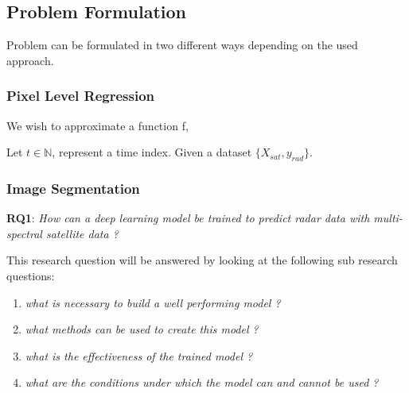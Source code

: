 \documentclass[acmtog, authorversion]{acmart}
\begin{document}


\subsection{Problem Formulation}
Problem can be formulated in two different ways depending on the used approach.

\subsubsection{Pixel Level Regression}
We wish to approximate a function f,

Let $t \in \mathbb{N}$, represent a time index.
Given a dataset $\{X_{sat}, y_{rad}\}$.  

\subsubsection{Image Segmentation}


\textbf{RQ1}: \textit{How can a deep learning model be trained to predict radar data with multi-spectral satellite data ?}
\smallskip

This research question will be answered by looking at the following sub research questions:
\begin{enumerate}
    \item \textit{what is necessary to build a well performing model ?}
    \item \textit{what methods can be used to create this model ?}
    \item \textit{what is the effectiveness of the trained model ?}
    \item \textit{what are the conditions under which the model can and cannot be used ?}
\end{enumerate}
\end{document}
